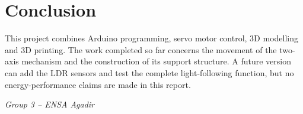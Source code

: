 \documentclass[10pt,a4paper]{article}
\begin{document}
\section{Conclusion}

This project combines Arduino programming, servo motor control, 3D modelling and 3D printing. The work completed so far concerns the movement of the two-axis mechanism and the construction of its support structure. A future version can add the LDR sensors and test the complete light-following function, but no energy-performance claims are made in this report.

\vfill
\begin{center}
  {\small\color{pink}\textit{Group 3 -- ENSA Agadir}}
\end{center}
\end{document}
